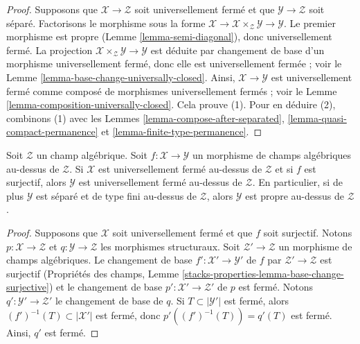 \begin{proof}
Supposons que $\mathcal{X} \to \mathcal{Z}$ soit universellement fermé et que
$\mathcal{Y} \to \mathcal{Z}$ soit séparé.
Factorisons le morphisme sous la forme
$\mathcal{X} \to \mathcal{X} \times_\mathcal{Z} \mathcal{Y} \to \mathcal{Y}$.
Le premier morphisme est propre (Lemme \ref{lemma-semi-diagonal}),
donc universellement fermé.
La projection $\mathcal{X} \times_\mathcal{Z} \mathcal{Y} \to \mathcal{Y}$
est déduite par changement de base d'un morphisme universellement fermé, donc
elle est universellement fermée ; voir le
Lemme \ref{lemma-base-change-universally-closed}.
Ainsi, $\mathcal{X} \to \mathcal{Y}$ est universellement fermé comme composé
de morphismes universellement fermés ; voir le
Lemme \ref{lemma-composition-universally-closed}.
Cela prouve (1). Pour en déduire (2), combinons (1) avec les
Lemmes \ref{lemma-compose-after-separated},
\ref{lemma-quasi-compact-permanence} et
\ref{lemma-finite-type-permanence}.
\end{proof}

\begin{lemma}
\label{lemma-image-proper-is-proper}
Soit $\mathcal{Z}$ un champ algébrique.
Soit $f : \mathcal{X} \to \mathcal{Y}$
un morphisme de champs algébriques au-dessus de $\mathcal{Z}$.
Si $\mathcal{X}$ est universellement fermé au-dessus de $\mathcal{Z}$
et si $f$ est surjectif, alors $\mathcal{Y}$
est universellement fermé au-dessus de $\mathcal{Z}$.
En particulier, si de plus $\mathcal{Y}$ est
séparé et de type fini au-dessus de $\mathcal{Z}$,
alors $\mathcal{Y}$ est propre au-dessus de $\mathcal{Z}$.
\end{lemma}

\begin{proof}
Supposons que $\mathcal{X}$ soit universellement fermé et que $f$ soit surjectif.
Notons $p : \mathcal{X} \to \mathcal{Z}$ et
$q : \mathcal{Y} \to \mathcal{Z}$ les morphismes structuraux.
Soit $\mathcal{Z}' \to \mathcal{Z}$ un morphisme de champs algébriques.
Le changement de base $f' : \mathcal{X}' \to \mathcal{Y}'$
de $f$ par $\mathcal{Z}' \to \mathcal{Z}$ est surjectif
(Propriétés des champs, Lemme
\ref{stacks-properties-lemma-base-change-surjective}) et le changement
de base $p' : \mathcal{X}' \to \mathcal{Z}'$ de $p$ est fermé.
Notons $q' : \mathcal{Y}' \to \mathcal{Z}'$ le changement de base de $q$.
Si $T \subset |\mathcal{Y}'|$ est fermé, alors
$(f')^{-1}(T) \subset |\mathcal{X}'|$ est fermé, donc
$p'((f')^{-1}(T)) = q'(T)$ est fermé. Ainsi, $q'$ est fermé.
\end{proof}






